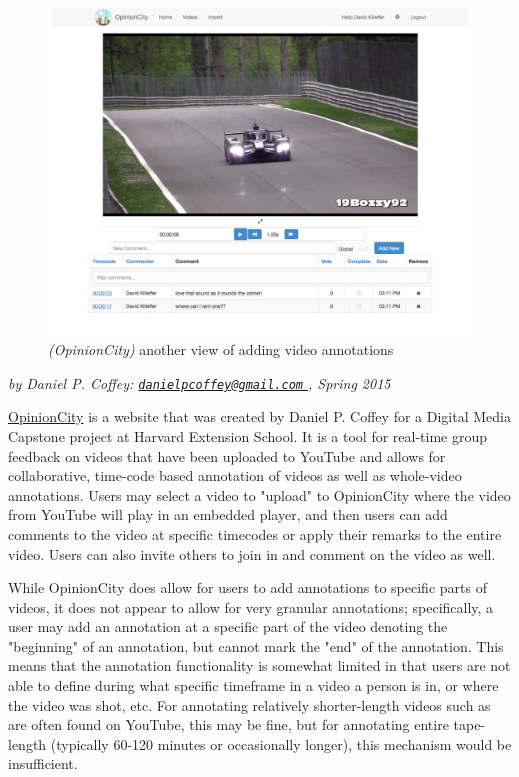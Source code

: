 \begin{figure}[!ht]
	\includegraphics[width=\textwidth]{gfx/opinion-city/car3.pdf}
	\caption{\textit{(OpinionCity)} another view of adding video annotations} 
	\label{fig:opinioncity:adding-video-annotations-view2}
	\center{\noindent\rule{0.75\textwidth}{0.4pt}}
\end{figure}

\textit{by Daniel P. Coffey: \href{mailto:danielpcoffey@gmail.com}{\nolinkurl{danielpcoffey@gmail.com} }, Spring 2015} \cite{WEB:OpinionCity:2015}

\href{http://opinion.city}{OpinionCity} is a website that was created by Daniel P. Coffey for a Digital Media Capstone project at Harvard Extension School.  It is a tool for real-time group feedback on videos that have been uploaded to YouTube and allows for collaborative, time-code based annotation of videos as well as whole-video annotations.  Users may select a video to "upload" to OpinionCity where the video from YouTube will play in an embedded player, and then users can add comments to the video at specific timecodes or apply their remarks to the entire video.  Users can also invite others to join in and comment on the video as well. 

While OpinionCity does allow for users to add annotations to specific parts of videos, it does not appear to allow for very granular annotations; specifically, a user may add an annotation at a specific part of the video denoting the "beginning" of an annotation, but cannot mark the "end" of the annotation.  This means that the annotation functionality is somewhat limited in that users are not able to define during what specific timeframe in a video a person is in, or where the video was shot, etc.  For annotating relatively shorter-length videos such as are often found on YouTube, this may be fine, but for annotating entire tape-length (typically 60-120 minutes or occasionally longer), this mechanism would be insufficient. 

